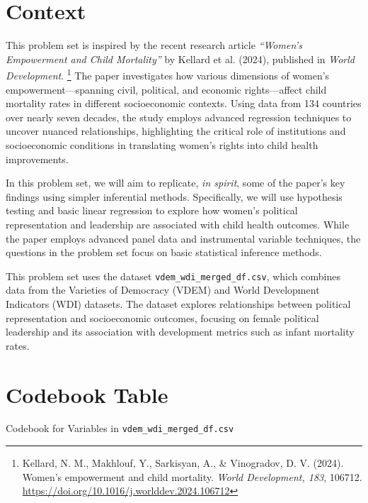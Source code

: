 \documentclass[a4paper, 11pt]{article}
\begin{document}

\newpage
\section*{Context}


This problem set is inspired by the recent research article \emph{``Women’s Empowerment and Child Mortality''} by Kellard et al. (2024), published in \emph{World Development}. \footnote{Kellard, N. M., Makhlouf, Y., Sarkisyan, A., \& Vinogradov, D. V. (2024). Women’s empowerment and child mortality. \emph{World Development, 183}, 106712. \url{https://doi.org/10.1016/j.worlddev.2024.106712}} The paper investigates how various dimensions of women’s empowerment—spanning civil, political, and economic rights—affect child mortality rates in different socioeconomic contexts. Using data from 134 countries over nearly seven decades, the study employs advanced regression techniques to uncover nuanced relationships, highlighting the critical role of institutions and socioeconomic conditions in translating women’s rights into child health improvements.

In this problem set, we will aim to replicate, \emph{in spirit}, some of the paper’s key findings using simpler inferential methods. Specifically, we will use hypothesis testing and basic linear regression to explore how women’s political representation and leadership are associated with child health outcomes. While the paper employs advanced panel data and instrumental variable techniques, the questions in the problem set focus on basic statistical inference methods.

This problem set uses the dataset \texttt{vdem\_wdi\_merged\_df.csv}, which combines data from the Varieties of Democracy (VDEM) and World Development Indicators (WDI) datasets. The dataset explores relationships between political representation and socioeconomic outcomes, focusing on female political leadership and its association with development metrics such as infant mortality rates.


\section*{Codebook Table}
Codebook for Variables in \texttt{vdem\_wdi\_merged\_df.csv}
\scriptsize
\end{document}
